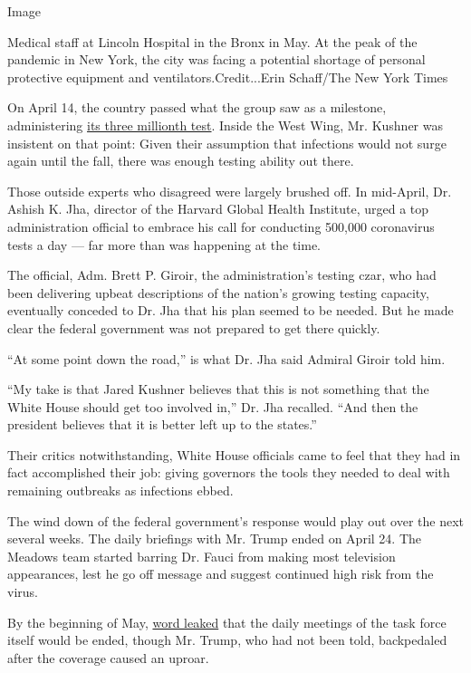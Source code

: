 Image

Medical staff at Lincoln Hospital in the Bronx in May. At the peak of
the pandemic in New York, the city was facing a potential shortage of
personal protective equipment and ventilators.Credit...Erin Schaff/The
New York Times

On April 14, the country passed what the group saw as a milestone,
administering \href{https://covidtracking.com/data/us-daily}{its three
millionth test}. Inside the West Wing, Mr. Kushner was insistent on that
point: Given their assumption that infections would not surge again
until the fall, there was enough testing ability out there.

Those outside experts who disagreed were largely brushed off. In
mid-April, Dr. Ashish K. Jha, director of the Harvard Global Health
Institute, urged a top administration official to embrace his call for
conducting 500,000 coronavirus tests a day --- far more than was
happening at the time.

The official, Adm. Brett P. Giroir, the administration's testing czar,
who had been delivering upbeat descriptions of the nation's growing
testing capacity, eventually conceded to Dr. Jha that his plan seemed to
be needed. But he made clear the federal government was not prepared to
get there quickly.

``At some point down the road,'' is what Dr. Jha said Admiral Giroir
told him.

``My take is that Jared Kushner believes that this is not something that
the White House should get too involved in,'' Dr. Jha recalled. ``And
then the president believes that it is better left up to the states.''

Their critics notwithstanding, White House officials came to feel that
they had in fact accomplished their job: giving governors the tools they
needed to deal with remaining outbreaks as infections ebbed.

The wind down of the federal government's response would play out over
the next several weeks. The daily briefings with Mr. Trump ended on
April 24. The Meadows team started barring Dr. Fauci from making most
television appearances, lest he go off message and suggest continued
high risk from the virus.

By the beginning of May,
\href{https://www.nytimes3xbfgragh.onion/2020/05/05/us/politics/coronavirus-task-force-trump.html}{word
leaked} that the daily meetings of the task force itself would be ended,
though Mr. Trump, who had not been told, backpedaled after the coverage
caused an uproar.

